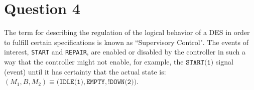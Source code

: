 \section{Question 4}

The term for describing the regulation of the logical behavior of a DES in order
to fulfill certain specifications is known as ``Supervisory Control". The events
of interest, \texttt{START} and \texttt{REPAIR}, are enabled or disabled by the
controller in such a way that the controller might not enable, for example, the
$\texttt{START(1)}$ signal (event) until it has certainty that the actual state is:
$(M_1, B, M_2) \equiv \texttt{(IDLE(1)}, \texttt{EMPTY}, \texttt{!DOWN(2)})$.

